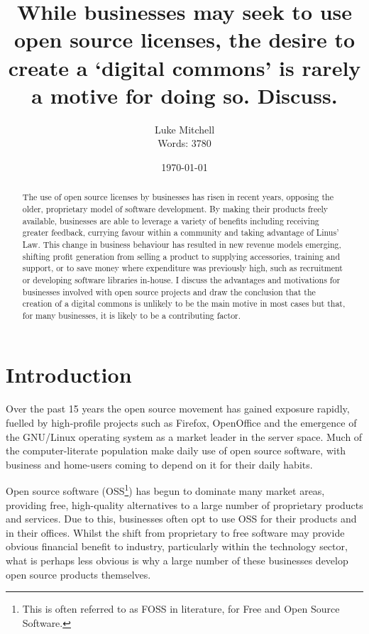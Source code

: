 \documentclass[a4paper]{article}
\title{While businesses may seek to use open source licenses, the desire to
create a ‘digital commons’ is rarely a motive for doing so. Discuss.}
\author{\begin{tabular}{r@{ }l} 
Luke Mitchell \\[1ex] 
Words: 3780
\end{tabular}}
\date{\today}
\begin{document}
\maketitle

\begin{abstract}
The use of open source licenses by businesses has risen in recent years, opposing the older, proprietary model of software development. By making their products freely available, businesses are able to leverage a variety of benefits including receiving greater feedback, currying favour within a community and taking advantage of Linus’ Law. This change in business behaviour has resulted in new revenue models emerging, shifting profit generation from selling a product to supplying accessories, training and support, or to save money where expenditure was previously high, such as recruitment or developing software libraries in-house. I discuss the advantages and motivations for businesses involved with open source projects and draw the conclusion that the creation of a digital commons is unlikely to be the main motive in most cases but that, for many businesses, it is likely to be a contributing factor.
\end{abstract}

\section{Introduction}

Over the past 15 years the open source movement has gained exposure rapidly, fuelled by high-profile projects such as Firefox\cite{firefox}\cite{browserstats}, OpenOffice\cite{openoffice}\cite{osalternatives} and the emergence of the GNU/Linux operating system as a market leader in the server space\cite{websurvey}\cite{osusage}. Much of the computer-literate population make daily use of open source software\cite{commonsoftware}\cite{commonsoftware2}, with business and home-users coming to depend on it for their daily habits.

Open source software (OSS\footnote{This is often referred to as FOSS in literature, for Free and Open Source Software.}) has begun to dominate many market areas, providing free, high-quality alternatives to a large number of proprietary products and services. Due to this, businesses often opt to use OSS for their products and in their offices. Whilst the shift from proprietary to free software may provide obvious financial benefit to industry, particularly within the technology sector\cite{buildessential}, what is perhaps less obvious is why a large number of these businesses develop open source products themselves.
\end{document}
